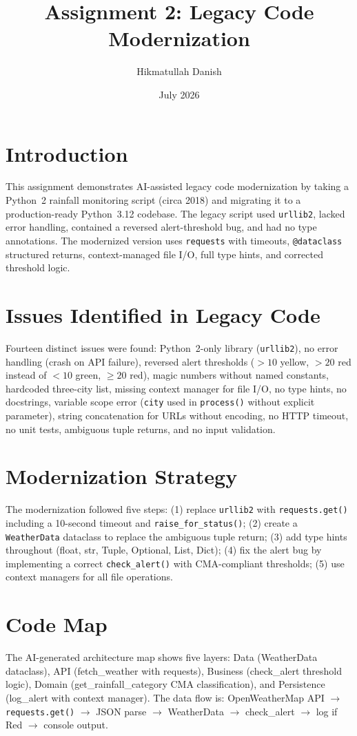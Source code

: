\documentclass[12pt,a4paper]{article}
\title{Assignment 2: Legacy Code Modernization}
\author{Hikmatullah Danish \quad 3125999089}
\date{July 2026}
\begin{document}
\maketitle

\section{Introduction}
This assignment demonstrates AI-assisted legacy code modernization by taking a Python~2 rainfall monitoring script (circa 2018) and migrating it to a production-ready Python~3.12 codebase. The legacy script used \texttt{urllib2}, lacked error handling, contained a reversed alert-threshold bug, and had no type annotations. The modernized version uses \texttt{requests} with timeouts, \texttt{@dataclass} structured returns, context-managed file I/O, full type hints, and corrected threshold logic.

\section{Issues Identified in Legacy Code}
Fourteen distinct issues were found: Python~2-only library (\texttt{urllib2}), no error handling (crash on API failure), reversed alert thresholds ($>10$ yellow, $>20$ red instead of $<10$ green, $\geq20$ red), magic numbers without named constants, hardcoded three-city list, missing context manager for file I/O, no type hints, no docstrings, variable scope error (\texttt{city} used in \texttt{process()} without explicit parameter), string concatenation for URLs without encoding, no HTTP timeout, no unit tests, ambiguous tuple returns, and no input validation.

\section{Modernization Strategy}
The modernization followed five steps: (1) replace \texttt{urllib2} with \texttt{requests.get()} including a 10-second timeout and \texttt{raise\_for\_status()}; (2) create a \texttt{WeatherData} dataclass to replace the ambiguous tuple return; (3) add type hints throughout (float, str, Tuple, Optional, List, Dict); (4) fix the alert bug by implementing a correct \texttt{check\_alert()} with CMA-compliant thresholds; (5) use context managers for all file operations.

\section{Code Map}
The AI-generated architecture map shows five layers: Data (WeatherData dataclass), API (fetch\_weather with requests), Business (check\_alert threshold logic), Domain (get\_rainfall\_category CMA classification), and Persistence (log\_alert with context manager). The data flow is: OpenWeatherMap API $\rightarrow$ \texttt{requests.get()} $\rightarrow$ JSON parse $\rightarrow$ WeatherData $\rightarrow$ check\_alert $\rightarrow$ log if Red $\rightarrow$ console output.
\end{document}
